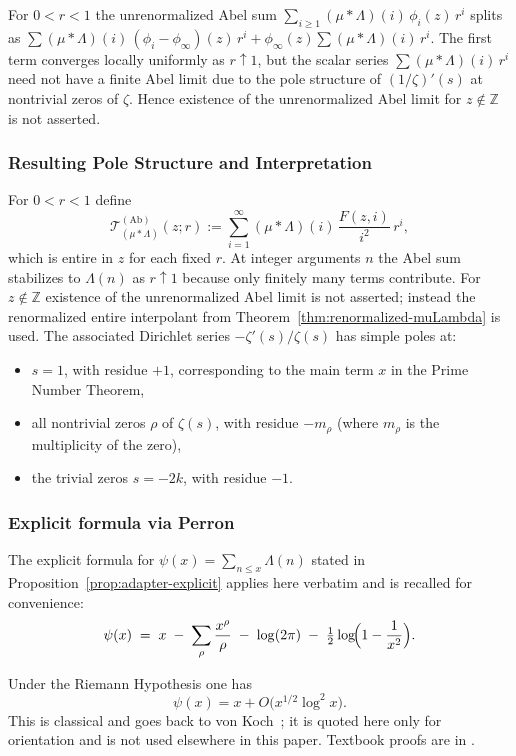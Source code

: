 \begin{remark}
For $0<r<1$ the unrenormalized Abel sum $\sum_{i\ge1}(\mu*\Lambda)(i)\,\phi_i(z)\,r^i$ splits as $\sum (\mu*\Lambda)(i)\,(\phi_i-\phi_\infty)(z)\,r^i+\phi_\infty(z)\sum (\mu*\Lambda)(i)\,r^i$. The first term converges locally uniformly as $r\uparrow1$, but the scalar series $\sum (\mu*\Lambda)(i)\,r^i$ need not have a finite Abel limit due to the pole structure of $(1/\zeta)'(s)$ at nontrivial zeros of $\zeta$. Hence existence of the unrenormalized Abel limit for $z\notin\mathbb Z$ is not asserted.
\end{remark}

\subsubsection{Resulting Pole Structure and Interpretation}
For $0<r<1$ define
\[
\mathcal{T}^{(\mathrm{Ab})}_{(\mu*\Lambda)}(z;r):=\sum_{i=1}^{\infty} (\mu*\Lambda)(i)\,\frac{F(z,i)}{i^2}\, r^i,
\]
which is entire in $z$ for each fixed $r$. At integer arguments $n$ the Abel sum stabilizes to $\Lambda(n)$ as $r\uparrow1$ because only finitely many terms contribute. For $z\notin\mathbb Z$ existence of the unrenormalized Abel limit is not asserted; instead the renormalized entire interpolant from Theorem~\ref{thm:renormalized-muLambda} is used. The associated Dirichlet series $-\zeta'(s)/\zeta(s)$ has simple poles at:
\begin{itemize}
    \item $s=1$, with residue $+1$, corresponding to the main term $x$ in the Prime Number Theorem,
    \item all nontrivial zeros $\rho$ of $\zeta(s)$, with residue $-m_\rho$ (where $m_\rho$ is the multiplicity of the zero),
    \item the trivial zeros $s=-2k$, with residue $-1$.
\end{itemize}

\subsubsection{Explicit formula via Perron}
The explicit formula for $\psi(x)=\sum_{n\le x}\Lambda(n)$ stated in Proposition~\ref{prop:adapter-explicit} applies here verbatim and is recalled for convenience:
\[
\psi(x)\;=\; x \;-\; \sum_{\rho}\frac{x^{\rho}}{\rho} \;-\; \log(2\pi) \;-\; \tfrac{1}{2}\log\!\Bigl(1-\frac{1}{x^{2}}\Bigr).
\]

\begin{corollary}[RH]
Under the Riemann Hypothesis one has
\[
\psi(x) = x + O\!\big(x^{1/2}\log^{2}x\big).
\]
This is classical and goes back to von Koch~\cite{vonkoch1901}; it is quoted here only for orientation and is not used elsewhere in this paper. Textbook proofs are in \cite{edwards2001,titchmarsh1986}.
\end{corollary}


